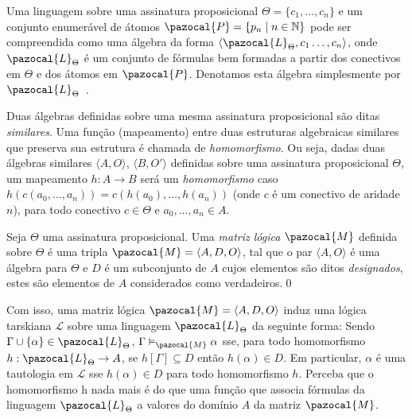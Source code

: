         \begin{observacao}
            Uma linguagem sobre uma assinatura proposicional $\Theta = \{c_{1}, \ldots, c_{n}\}$ e um conjunto enumerável de átomos $\pazocal{P} = \{p_{n} \; | \; n \in \mathbb{N} \}$ pode ser compreendida como uma álgebra da forma $\langle \pazocal{L}_{\Theta}, c_{1}\ldots, c_{n} \rangle$, onde $\pazocal{L}_{\Theta}$ é um conjunto de fórmulas bem formadas a partir dos conectivos em $\Theta$ e dos átomos em $\pazocal{P}$. Denotamos esta álgebra simplesmente por $\pazocal{L}_{\Theta}$~\cite{Sikorski1966-SIKAOF,Wojcicki1984-WJCLOP}.
        \end{observacao}

        Duas álgebras definidas sobre uma mesma assinatura proposicional são ditas \textit{similares}. Uma função (mapeamento) entre duas estruturas algebraicas similares que preserva sua estrutura é chamada de \textit{homomorfismo}. Ou seja, dadas duas álgebras similares $\langle A, O \rangle$, $\langle B, O' \rangle$ definidas sobre uma assinatura proposicional $\Theta$, um mapeamento $h : A \to B$ será um \textit{homomorfismo} caso $h(c(a_{0},\ldots, a_{n})) = c(h(a_{0}),\ldots, h(a_{n}))$ (onde $c$ é um conectivo de aridade $n$), para todo conectivo $c \in \Theta$ e $a_{0},\ldots,a_{n} \in A$.

        \begin{definicao}
            Seja $\Theta$ uma assinatura proposicional. Uma \textit{matriz lógica} $\pazocal{M}$ definida sobre $\Theta$ é uma tripla $\pazocal{M} = \langle A, D, O \rangle$, tal que o par $\langle A, O \rangle$ é uma álgebra para $\Theta$ e $D$ é um subconjunto de $A$ cujos elementos são ditos \textit{designados}, estes são elementos de $A$ considerados como verdadeiros.\qed{}
        \end{definicao}

        Com isso, uma matriz lógica $\pazocal{M} = \langle A, D, O \rangle$ induz uma lógica tarskiana $\mathcal{L}$ sobre uma linguagem $\pazocal{L}_{\Theta}$ da seguinte forma: Sendo $\Gamma \cup \{\alpha\} \in \pazocal{L}_{\Theta}$, $\Gamma \vDash_{\pazocal{M}} \alpha$ sse, para todo homomorfismo $h : \pazocal{L}_{\Theta} \to A$, se $h[\Gamma] \subseteq D$ então $h(\alpha) \in D$. Em particular, $\alpha$ é uma tautologia em $\mathcal{L}$ sse $h(\alpha) \in D$ para todo homomorfismo $h$. Perceba que o homomorfismo h nada mais é do que uma função que associa fórmulas da linguagem $\pazocal{L}_{\Theta}$ a valores do domínio $A$ da matriz $\pazocal{M}$.

